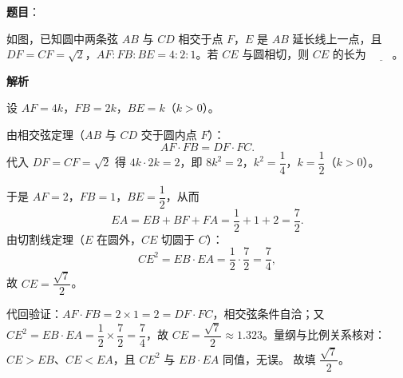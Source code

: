 \begin{answer}

\textbf{题目}：

如图，已知圆中两条弦 $AB$ 与 $CD$ 相交于点 $F$，$E$ 是 $AB$ 延长线上一点，且 $DF=CF=\sqrt2$，$AF:FB:BE=4:2:1$。若 $CE$ 与圆相切，则 $CE$ 的长为 $\underline{\qquad}$。
\nopagebreak[4]
\begin{center}\end{center}
\nopagebreak[4]
\textbf{解析}

设 $AF=4k$，$FB=2k$，$BE=k$（$k>0$）。

由相交弦定理（$AB$ 与 $CD$ 交于圆内点 $F$）：
\nopagebreak[4]
\[AF\cdot FB=DF\cdot FC.\]
代入 $DF=CF=\sqrt2$ 得 $4k\cdot2k=2$，即 $8k^2=2$，$k^2=\dfrac14$，$k=\dfrac12$（$k>0$）。

于是 $AF=2$，$FB=1$，$BE=\dfrac12$，从而
\nopagebreak[4]
\[EA=EB+BF+FA=\frac12+1+2=\frac72.\]
由切割线定理（$E$ 在圆外，$CE$ 切圆于 $C$）：
\nopagebreak[4]
\[CE^2=EB\cdot EA=\frac12\cdot\frac72=\frac74,\]
故 $CE=\dfrac{\sqrt7}{2}$。

代回验证：$AF\cdot FB=2\times1=2=DF\cdot FC$，相交弦条件自洽；又 $CE^2=EB\cdot EA=\dfrac12\times\dfrac72=\dfrac74$，故 $CE=\dfrac{\sqrt7}{2}\approx1.323$。量纲与比例关系核对：$CE>EB$、$CE<EA$，且 $CE^2$ 与 $EB\cdot EA$ 同值，无误。
故填 $\dfrac{\sqrt7}{2}$。


\end{answer}
